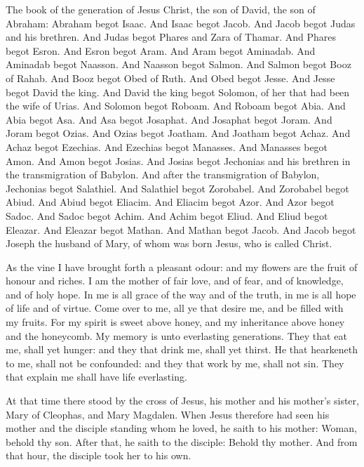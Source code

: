 The book of the generation of Jesus Christ, the son of David, the
son of Abraham:
Abraham begot Isaac. And Isaac begot Jacob. And Jacob begot Judas
and his brethren.
And Judas begot Phares and Zara of Thamar. And Phares begot Esron.
And Esron begot Aram.
And Aram begot Aminadab. And Aminadab begot Naasson. And Naasson
begot Salmon.
And Salmon begot Booz of Rahab. And Booz begot Obed of Ruth.  And
Obed begot Jesse.
And Jesse begot David the king. And David the king begot Solomon,
of her that had been the wife of Urias.
And Solomon begot Roboam. And Roboam begot Abia. And Abia begot
Asa.
And Asa begot Josaphat. And Josaphat begot Joram. And Joram begot
Ozias.
And Ozias begot Joatham. And Joatham begot Achaz. And Achaz begot
Ezechias.
And Ezechias begot Manasses. And Manasses begot Amon. And Amon
begot Josias.
And Josias begot Jechonias and his brethren in the transmigration
of Babylon.
And after the transmigration of Babylon, Jechonias begot
Salathiel. And Salathiel begot Zorobabel.
And Zorobabel begot Abiud. And Abiud begot Eliacim. And Eliacim
begot Azor.
And Azor begot Sadoc. And Sadoc begot Achim. And Achim begot
Eliud.
And Eliud begot Eleazar. And Eleazar begot Mathan. And Mathan
begot Jacob.
And Jacob begot Joseph the husband of Mary, of whom was born
Jesus, who is called Christ.



\bigskip



\label{Ep.immacheart}

As the vine I have brought forth a pleasant odour: and my flowers
are the fruit of honour and riches.
I am the mother of fair love, and of fear, and of knowledge, and
of holy hope.
In me is all grace of the way and of the truth, in me is all hope
of life and of virtue.
Come over to me, all ye that desire me, and be filled with my
fruits.
For my spirit is sweet above honey, and my inheritance above
honey and the honeycomb.
My memory is unto everlasting generations.
They that eat me, shall yet hunger: and they that drink me, shall
yet thirst.
He that hearkeneth to me, shall not be confounded: and they that
work by me, shall not sin.
They that explain me shall have life everlasting.


\label{Go.stabant}

At that time there stood by the cross of Jesus, his mother and his
mother's sister, Mary of Cleophas, and Mary Magdalen.
When Jesus therefore had seen his mother and the disciple
standing whom he loved, he saith to his mother: Woman, behold thy son.
After that, he saith to the disciple: Behold thy mother.  And
from that hour, the disciple took her to his own.


